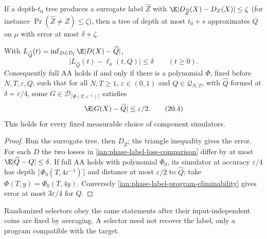 \begin{theorem}
\label{ian:phase-label-elimination}
If a depth-\(t_0\) tree produces a surrogate label \(\widehat Z\) with
\(\E|D_{\widehat Z}(X)-D_Z(X)|\le\zeta\) (for instance
\(\Pr(\widehat Z\ne Z)\le\zeta\)), then a tree of depth at most
\(t_0+s\) approximates \(Q\) on \(\mu\) with error at most
\(\delta+\zeta\).

With \(L_{\widehat Q}(t)=\inf_{D\in\mathcal D_t}\E|D(X)-\widehat Q|\),
\[
 \bigl|L_{\widehat Q}(t)-\ell_\mu(t,Q)\bigr|\le\delta
 \qquad(t\ge0).
 \tag{20.3}\label{ian:phase-label-loss-comparison}
\]
Consequently full AA holds if and only if there is a polynomial \(\Phi\),
fixed before \(N,T,\varepsilon,Q\), such that for all \(N,T\ge1\),
\(\varepsilon\in(0,1)\) and \(Q\in\mathcal Q_{N,T}\), with
\(\widehat Q\) formed at \(\delta=\varepsilon/4\), some
\(G\in\mathcal D_{\lceil\Phi(T,\varepsilon^{-1})\rceil}\) satisfies
\[
 \E|G(X)-\widehat Q|\le\varepsilon/2.
 \tag{20.4}\label{ian:phase-label-program-eliminability}
\]
This holds for every fixed measurable choice of component simulators.
\end{theorem}

\begin{proof}
Run the surrogate tree, then \(D_{\widehat Z}\); the triangle inequality
gives the error. For each \(D\) the two losses in
\eqref{ian:phase-label-loss-comparison} differ by at most
\(\E|\widehat Q-Q|\le\delta\). If full AA holds with polynomial
\(\Phi_0\), its simulator at accuracy \(\varepsilon/4\) has depth
\(\lceil\Phi_0(T,4\varepsilon^{-1})\rceil\) and distance at most
\(\varepsilon/2\) to \(\widehat Q\); take \(\Phi(T,y)=\Phi_0(T,4y)\).
Conversely \eqref{ian:phase-label-program-eliminability} gives error at
most \(3\varepsilon/4\) for \(Q\).
\end{proof}

Randomized selectors obey the same statements after their
input-independent coins are fixed by averaging. A selector need not
recover the label, only a program compatible with the target.

